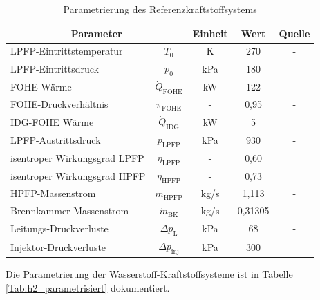 \begin{table}[ht]
    \centering
	\caption{Parametrierung des Referenzkraftstoffsystems}
	\begin{tabular} {|l|c|c|c|c|} \hline%
		\multicolumn{2}{|c|}{Parameter} & Einheit & Wert & Quelle\\ \hline\hline%
        LPFP-Eintrittstemperatur & $T_0$ & K & 270 & - \\ \hline
        LPFP-Eintrittsdruck & $p_0$ & kPa & 180 & \cite{EatonFuelSystemsDivision.2013} \\ \hline
        FOHE-Wärme & $\dot{Q}_{\mathrm{FOHE}}$ & kW & 122 & - \\ \hline
        FOHE-Druckverhältnis & $\pi_{\mathrm{FOHE}}$ & - & 0,95 & - \\ \hline
        IDG-FOHE Wärme  & $\dot{Q}_\mathrm{IDG}$ & kW & 5 & \cite{Sciatti.2024} \\ \hline
        LPFP-Austrittsdruck & $p_\mathrm{LPFP}$ & kPa & 930 & - \\ \hline
        isentroper Wirkungsgrad LPFP & $\eta_\mathrm{LPFP}$ & - & 0,60 & \cite{Zhou.2023} \\ \hline
        isentroper Wirkungsgrad HPFP & $\eta_\mathrm{HPFP}$ & - & 0,73 & \cite{Xu.2024} \\ \hline
        HPFP-Massenstrom & $\dot{m}_\mathrm{HPFP}$ & kg/s & 1,113 & - \\ \hline
        Brennkammer-Massenstrom & $\dot{m}_\mathrm{BK}$ & kg/s & 0,31305 & - \\ \hline
        Leitungs-Druckverluste & $\Delta p_\mathrm{L}$ & kPa & 68 & - \\ \hline
        Injektor-Druckverluste & $\Delta p_\mathrm{inj}$ & kPa & 300 & \cite{Mazaheri.2012} \\ \hline
	\end{tabular}	
    \label{Tab:referenz_parametrisiert}%
\end{table}
\FloatBarrier 

Die Parametrierung der Wasserstoff-Kraftstoffsysteme ist in Tabelle \ref{Tab:h2_parametrisiert} dokumentiert.

